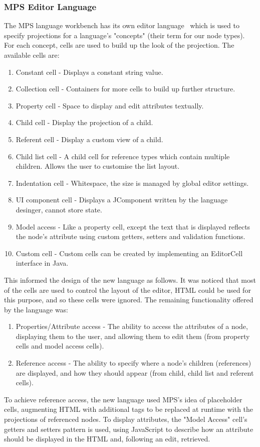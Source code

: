 \documentclass{article}
\begin{document}
{\subsubsection{MPS Editor Language}
The MPS language workbench has its own editor language~\cite{mpsEditorLanguage} which is used to specify projections for a language's "concepts" (their term for our node types). For each concept, cells are used to build up the look of the projection. The available cells are:
\begin{enumerate}
\item Constant cell - Displays a constant string value.
\item Collection cell - Containers for more cells to build up further structure.
\item Property cell - Space to display and edit attributes textually.
\item Child cell - Display the projection of a child.
\item Referent cell - Display a custom view of a child.
\item Child list cell - A child cell for reference types which contain multiple children. Allows the user to customise the list layout.
\item Indentation cell - Whitespace, the size is managed by global editor settings.
\item UI component cell - Displays a JComponent written by the language desinger, cannot store state.
\item Model access - Like a property cell, except the text that is displayed reflects the node's attribute using custom getters, setters and validation functions.
\item Custom cell - Custom cells can be created by implementing an EditorCell interface in Java.
\end{enumerate}
%
This informed the design of the new language as follows. It was noticed that most of the cells are used to control the layout of the editor, HTML could be used for this purpose, and so these cells were ignored. The remaining functionality offered by the language was:
\begin{enumerate}
\item Properties/Attribute access - The ability to access the attributes of a node, displaying them to the user, and allowing them to edit them  (from property cells and model access cells).
\item Reference access - The ability to specify where a node's children (references) are displayed, and how they should appear (from child, child list and referent cells).
\end{enumerate}
To achieve reference access, the new language used MPS's idea of placeholder cells, augmenting HTML with additional tags to be replaced at runtime with the projections of referenced nodes. To display attributes, the "Model Access" cell's getters and setters pattern is used, using JavaScript to describe how an attribute should be displayed in the HTML and, following an edit, retrieved. 

}
\end{document}
